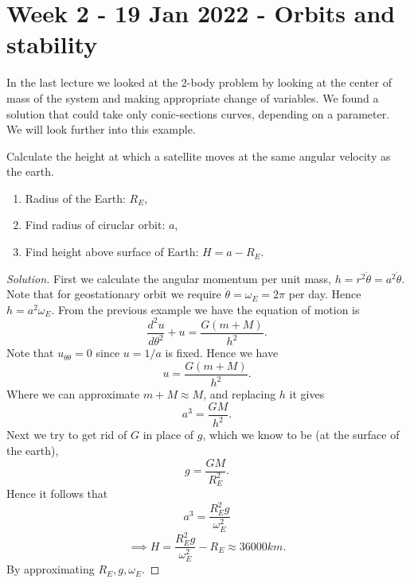 \section{Week 2 - 19 Jan 2022 - Orbits and stability}
In the last lecture we looked at the 2-body problem by looking at the center of
mass of the system and making appropriate change of variables. We found a
solution that could take only conic-sections curves, depending on a parameter.
We will look further into this example.
\begin{example}
  Calculate the height at which a satellite moves at the same angular velocity
  as the earth. 
  \begin{enumerate}
    \item Radius of the Earth: $R_E$,
    \item Find radius of ciruclar orbit: $a$,
    \item Find height above surface of Earth: $H=a-R_E$.
  \end{enumerate}
\end{example}
\begin{proof}[Solution]
  First we calculate the angular momentum per unit mass,
  $h=r^2\dot{\theta}=a^2\dot{\theta}$. Note that for geostationary orbit we
  require $\dot{\theta}=\omega_E = 2\pi$ per day. Hence $h=a^2\omega_E$. From
  the previous example we have the equation of motion is
  \[\frac{d^2u}{d\theta^2} + u = \frac{G(m+M)}{h^2}.\]
  Note that $u_{\theta\theta}=0$ since $u=1/a$ is fixed. Hence we have 
  \[ u = \frac{G(m+M)}{h^2}.\]
  Where we can approximate $m+M\approx M$, and replacing $h$ it gives 
  \[a^3=\frac{G M}{h^2}.\]
  Next we try to get rid of $G$ in place of $g$, which we know to be (at the
  surface of the earth),
  \[g=\frac{GM}{R_E^2}.\]
  Hence it follows that 
  \[a^3 = \frac{R_E^2 g}{\omega_E^2}\]
  \[\implies H = \frac{R_E^2 g}{\omega_E^2} - R_E \approx 36000 km.\]
  By approximating $R_E, g, \omega_E$.
\end{proof}

